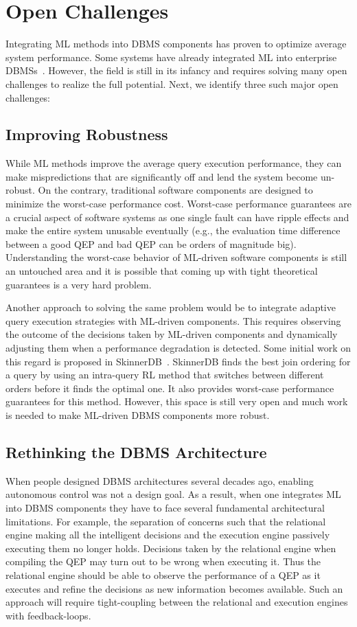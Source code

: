 \section{Open Challenges}
Integrating ML methods into DBMS components has proven to optimize average system performance.
Some systems have already integrated ML into enterprise DBMSs~\cite{leo, cardlearner, verdict}.
However, the field is still in its infancy and requires solving many open challenges to realize the full potential.
Next, we identify three such major open challenges:


\subsection{Improving Robustness} While ML methods improve the average query execution performance, they can make mispredictions that are significantly off and lend the system become un-robust.
On the contrary, traditional software components are designed to minimize the worst-case performance cost.
Worst-case performance guarantees are a crucial aspect of software systems as one single fault can have ripple effects and make the entire system unusable eventually (e.g., the evaluation time difference between a good QEP and bad QEP can be orders of magnitude big).
Understanding the worst-case behavior of ML-driven software components is still an untouched area and it is possible that coming up with tight theoretical guarantees is a very hard problem.
 
Another approach to solving the same problem would be to integrate adaptive query execution strategies with ML-driven components.
This requires observing the outcome of the decisions taken by ML-driven components and dynamically adjusting them when a performance degradation is detected.
Some initial work on this regard is proposed in SkinnerDB~\cite{skinnerdb}.
SkinnerDB finds the best join ordering for a query by using an intra-query RL method that switches between different orders before it finds the optimal one.
It also provides worst-case performance guarantees for this method.
However, this space is still very open and much work is needed to make ML-driven DBMS components more robust.


\subsection{Rethinking the DBMS Architecture} When people designed DBMS architectures several decades ago, enabling autonomous control was not a design goal.
As a result, when one integrates ML into DBMS components they have to face several fundamental architectural limitations.
For example, the separation of concerns such that the relational engine making all the intelligent decisions and the execution engine passively executing them no longer holds.
Decisions taken by the relational engine when compiling the QEP may turn out to be wrong when executing it.
Thus the relational engine should be able to observe the performance of a QEP as it executes and refine the decisions as new information becomes available.
Such an approach will require tight-coupling between the relational and execution engines with feedback-loops.

